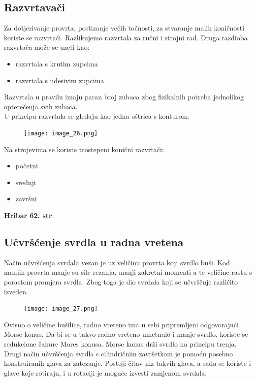 \documentclass[a4paper,12pt]{article}
\numberwithin{figure}{section}
\begin{document}
\subsection{Razvrtavači}
Za dotjerivanje provrta, postizanje većih točnosti, za stvaranje malih koničnosti koriste se razvrtači. Razlikujemo razvrtala za ručni i strojni rad. Druga razdioba razvrtača može se  uzeti kao:
\begin{itemize}
\item razvrtala s krutim zupcima
\item razvrtala s udesivim zupcima
\end{itemize}
Razvrtala u pravilu imaju paran broj zubaca zbog fizikalnih potreba jednolikog opterečenja svih zubaca.\\
U principu razvrtala se gledaju kao jedna oštrica s konturom.
\begin{figure}[!h]
\centering
\texttt{[image: image\_26.png]}
\end{figure}
\FloatBarrier
\noindent Na strojevima se koriste trostepeni konični razvrtači:
\begin{itemize}
\item početni
\item srednji
\item završni
\end{itemize}
\textbf{Hribar 62. str}.
\clearpage
\subsection{Učvršćenje svrdla u radna vretena}
Način učvršćenja svrdala vezan je uz veličinu provrta koji svrdlo buši. Kod manjih provrta manje su sile rezanja, manji zakretni momenti a te veličine rastu s porastom promjera svrdla. Zbog toga je dio svrdala koji se učvrščuje različito izveden.
\begin{figure}[!h]
\centering
\texttt{[image: image\_27.png]}
\end{figure}
\FloatBarrier
Ovisno o veličine bušilice, radno vreteno ima u sebi pripremljeni odgovorajući Morse konus. Da bi se u takvo radno vreteno umetnulo i manje svrdlo, koriste se redukcione čahure Mores konusa. Morse konus drži svrdlo na principu trenja.\\
Drugi način učvršćenja svrdla s cilindričnim završetkom je pomoću posebno konstruiranih glava za zatezanje. Postoji čitav niz takvih glava, a sada se koriste i glave koje rotiraju, i u rotaciji je moguće izvesti zamjenom svrdala.
\end{document}
